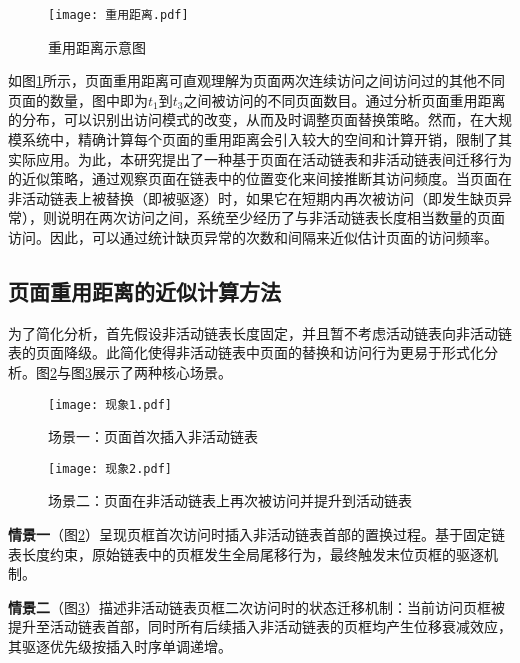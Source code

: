 \begin{figure}[htbp]
  \centering
  \texttt{[image: 重用距离.pdf]}
  \caption{重用距离示意图}
  \label{fig:refault_distance}
\end{figure}


如图\ref{fig:refault_distance}所示，页面重用距离可直观理解为页面两次连续访问之间访问过的其他不同页面的数量，图中即为\(t_1\)到\(t_3\)之间被访问的不同页面数目。通过分析页面重用距离的分布，可以识别出访问模式的改变，从而及时调整页面替换策略。然而，在大规模系统中，精确计算每个页面的重用距离会引入较大的空间和计算开销，限制了其实际应用。为此，本研究提出了一种基于页面在活动链表和非活动链表间迁移行为的近似策略，通过观察页面在链表中的位置变化来间接推断其访问频度。当页面在非活动链表上被替换（即被驱逐）时，如果它在短期内再次被访问（即发生缺页异常），则说明在两次访问之间，系统至少经历了与非活动链表长度相当数量的页面访问。因此，可以通过统计缺页异常的次数和间隔来近似估计页面的访问频率。




\subsection{页面重用距离的近似计算方法}
\label{sec:重用距离的近似推导}
为了简化分析，首先假设非活动链表长度固定，并且暂不考虑活动链表向非活动链表的页面降级。此简化使得非活动链表中页面的替换和访问行为更易于形式化分析。图\ref{fig:现象1}与图\ref{fig:现象2}展示了两种核心场景。

\begin{figure}[htbp]
  \centering
  \texttt{[image: 现象1.pdf]}
  \caption{场景一：页面首次插入非活动链表}
  \label{fig:现象1}
\end{figure}

\begin{figure}[htbp]
  \centering
  \texttt{[image: 现象2.pdf]}
  \caption{场景二：页面在非活动链表上再次被访问并提升到活动链表}
  \label{fig:现象2}
\end{figure}

\textbf{情景一}（图\ref{fig:现象1}）呈现页框首次访问时插入非活动链表首部的置换过程。基于固定链表长度约束，原始链表中的页框发生全局尾移行为，最终触发末位页框的驱逐机制。

\textbf{情景二}（图\ref{fig:现象2}）描述非活动链表页框二次访问时的状态迁移机制：当前访问页框被提升至活动链表首部，同时所有后续插入非活动链表的页框均产生位移衰减效应，其驱逐优先级按插入时序单调递增。


